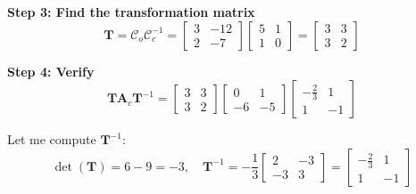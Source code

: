 \begin{example}
\textbf{Step 3: Find the transformation matrix}
\begin{equation}
\mathbf{T} = \mathcal{C}_o \mathcal{C}_c^{-1} = \begin{bmatrix} 3 & -12 \\ 2 & -7 \end{bmatrix}\begin{bmatrix} 5 & 1 \\ 1 & 0 \end{bmatrix} = \begin{bmatrix} 3 & 3 \\ 3 & 2 \end{bmatrix}
\end{equation}

\textbf{Step 4: Verify}
\begin{equation}
\mathbf{T}\mathbf{A}_c\mathbf{T}^{-1} = \begin{bmatrix} 3 & 3 \\ 3 & 2 \end{bmatrix}\begin{bmatrix} 0 & 1 \\ -6 & -5 \end{bmatrix}\begin{bmatrix} -\frac{2}{3} & 1 \\ 1 & -1 \end{bmatrix}
\end{equation}

Let me compute $\mathbf{T}^{-1}$:
\begin{equation}
\det(\mathbf{T}) = 6 - 9 = -3, \quad \mathbf{T}^{-1} = -\frac{1}{3}\begin{bmatrix} 2 & -3 \\ -3 & 3 \end{bmatrix} = \begin{bmatrix} -\frac{2}{3} & 1 \\ 1 & -1 \end{bmatrix}
\end{equation}


\end{example}
